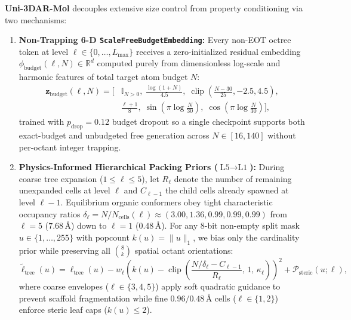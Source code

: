 \documentclass[11pt,a4paper]{article}
\begin{document}
\textbf{Uni-3DAR-Mol} decouples extensive size control from property conditioning via two mechanisms:
\begin{enumerate}[leftmargin=1.6em,itemsep=2pt,topsep=2pt]
    \item \textbf{Non-Trapping 6-D \texttt{ScaleFree\allowbreak Budget\allowbreak Embedding}:} Every non-EOT octree token at level $\ell \in \{0, \dots, L_{\max}\}$ receives a zero-initialized residual embedding $\phi_{\text{budget}}(\ell, N) \in \mathbb{R}^d$ computed purely from dimensionless log-scale and harmonic features of total target atom budget $N$:
    \begin{equation}
    \label{eq:budget_emb}
    \begin{aligned}
    \mathbf{z}_{\text{budget}}(\ell, N) = \Big[&\mathbb{I}_{N>0},\; \frac{\log(1+N)}{4.5},\; \operatorname{clip}\!\left(\frac{N-30}{25}, -2.5, 4.5\right), \\
    &\frac{\ell+1}{8},\; \sin\!\left(\pi \log\frac{N}{30}\right),\; \cos\!\left(\pi \log\frac{N}{30}\right)\Big],
    \end{aligned}
    \end{equation}
    trained with $p_{\text{drop}} = 0.12$ budget dropout so a single checkpoint supports both exact-budget and unbudgeted free generation across $N \in [16, 140]$ without per-octant integer trapping.
    \item \textbf{Physics-Informed Hierarchical Packing Priors ($\text{L5}\to\text{L1}$):} During coarse tree expansion ($1 \le \ell \le 5$), let $R_\ell$ denote the number of remaining unexpanded cells at level $\ell$ and $C_{\ell-1}$ the child cells already spawned at level $\ell-1$. Equilibrium organic conformers obey tight characteristic occupancy ratios $\delta_\ell = N / N_{\text{cells}}(\ell) \approx (3.00, 1.36, 0.99, 0.99, 0.99)$ from $\ell=5$ ($7.68\,\text{\AA}$) down to $\ell=1$ ($0.48\,\text{\AA}$). For any 8-bit non-empty split mask $u \in \{1,\dots,255\}$ with popcount $k(u) = \|u\|_1$, we bias only the cardinality prior while preserving all $\binom{8}{k}$ spatial octant orientations:
    \begin{equation}
    \label{eq:vol_prior}
    \tilde{\ell}_{\text{tree}}(u) = \ell_{\text{tree}}(u) - w_\ell \left(k(u) - \operatorname{clip}\!\left(\frac{N/\delta_\ell - C_{\ell-1}}{R_\ell},\, 1,\, \kappa_\ell\right)\right)^2 + \mathcal{P}_{\text{steric}}(u; \ell),
    \end{equation}
    where coarse envelopes ($\ell \in \{3,4,5\}$) apply soft quadratic guidance to prevent scaffold fragmentation while fine $0.96/0.48\,\text{\AA}$ cells ($\ell \in \{1,2\}$) enforce steric leaf caps ($k(u) \le 2$).
\end{enumerate}
\end{document}

